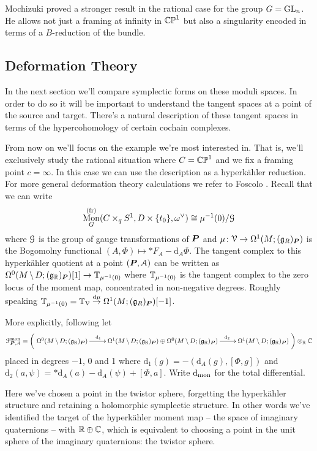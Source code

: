 \documentclass[10pt, oneside]{article}
\DeclareMathOperator{\mon}{Mon}
\renewcommand{\d}{\mathrm{d}}
\newcommand{\fr}{\mathrm{fr}}
\begin{document}
\begin{remark}
Mochizuki \cite{Mochizuki} proved a stronger result in the rational case for the group $G = \mathrm{GL}_n$.  He allows not just a framing at infinity in $\mathbb{CP}^1$ but also a singularity encoded in terms of a $B$-reduction of the bundle. 
\end{remark}

\subsection{Deformation Theory} \label{def_section}
In the next section we'll compare symplectic forms on these moduli spaces.  In order to do so it will be important to understand the tangent spaces at a point of the source and target.  There's a natural description of these tangent spaces in terms of the hypercohomology of certain cochain complexes.

From now on we'll focus on the example we're most interested in.  That is, we'll exclusively study the rational situation where $C = \mathbb{CP}^1$ and we fix a framing point $c = \infty$.  In this case we can use the description as a hyperk\"ahler reduction.  For more general deformation theory calculations we refer to Foscolo \cite{FoscoloDef}.  Recall that we can write
\[\mon^{(\fr)}_G(C \times_q S^1, D \times \{t_0\}, \omega^\vee) \iso \mu^{-1}(0)/ \mc G\]
where $\mathcal{G}$ is the group of gauge transformations of $\boldsymbol{P}$ and $\mu \colon \mathcal{V} \to \Omega^1(M; (\mathfrak{g}_R)_{\boldsymbol{P}})$ is the Bogomolny functional $(A,\Phi) \mapsto \ast F_A - \d_A \Phi$.  The tangent complex to this hyperk\"ahler quotient at a point $(\boldsymbol{P}, \mathcal{A})$ can be written as $\Omega^0(M \!\ \backslash \ \! D; (\mathfrak{g}_{\mathbb{R}})_{\boldsymbol{P}})[1] \to \mathbb{T}_{\mu^{-1}(0)}$ where $\mathbb{T}_{\mu^{-1}(0)}$ is the tangent complex to the zero locus of the moment map, concentrated in non-negative degrees. Roughly speaking $\bb T_{\mu^{-1}(0)} = \bb T_{\mc V} \overset {\d\mu} \to \Omega^1(M; (\gg_R)_{\bo P})[-1]$.  

More explicitly, following \cite{FoscoloDef} let 
\[\mc F^{\mr{mon}}_{\bo P, \mc A} = \left(\xymatrix{
\Omega^0(M \!\bs\! D; (\gg_\RR)_{\bo P}) \ar[r]^(.36){\d_1} &\Omega^1(M \!\bs\! D; (\gg_\RR)_{\bo P}) \oplus \Omega^0(M \!\bs\! D; (\gg_\RR)_{\bo P}) \ar[r]^(.64){\d_2} &\Omega^1(M \!\bs\! D; (\gg_\RR)_{\bo P})
}\right) \otimes_\RR \CC\]
placed in degrees $-1$, 0 and 1 where $\d_1(g) = -(\d_A(g),[\Phi, g])$ and $\d_2(a,\psi) = \ast \d_A(a) - \d_A(\psi) + [\Phi,a]$.  Write $\d_{\mr{mon}}$ for the total differential.

\begin{remark}
Here we've chosen a point in the twistor sphere, forgetting the hyperk\"ahler structure and retaining a holomorphic symplectic structure.  In other words we've identified the target of the hyperk\"ahler moment map -- the space of imaginary quaternions -- with $\mathbb{R} \oplus \mathbb{C}$, which is equivalent to choosing a point in the unit sphere of the imaginary quaternions: the twistor sphere.  
\end{remark}
\end{document}

